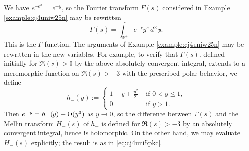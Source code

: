 \documentclass[reqno]{amsart} 
\begin{document}
\begin{example}
  We have $e^{- e^x } = e^{- y}$, so the Fourier transform $F(s)$ considered in Example \ref{example:cj4uniw25n} may be rewritten
  \begin{equation*}
\Gamma(s) = \int_{\mathbb{R}^+} e^{- y } y^s \,d^\times y.
  \end{equation*}
  This is the $\Gamma$-function.  The  arguments of Example \ref{example:cj4uniw25n} may be rewritten in the new variables.  For example, to verify that $\Gamma(s)$, defined initially for $\Re(s) > 0$ by the above absolutely convergent integral, extends to a meromorphic function on $\Re(s) > -3$ with the prescribed polar behavior, we define
  \begin{equation*}
h_-(y) :=
\begin{cases}
1 - y + \frac{y^2}{2!} & \text{ if } 0 < y \leq 1, \\
0 & \text{ if } y > 1.
\end{cases}
  \end{equation*}
  Then $e^{-y} = h_-(y) + \operatorname{O}(y^3)$ as $y \rightarrow 0$, so the difference between $\Gamma(s)$ and the Mellin transform $H_-(s)$ of $h_-$ is defined for $\Re(s) > -3$ by an absolutely convergent integral, hence is holomorphic.  On the other hand, we may evaluate $H_-(s)$ explicitly; the result is as in \eqref{eq:cj4uni5pkc}.
\end{example}




{} 
\end{document}
